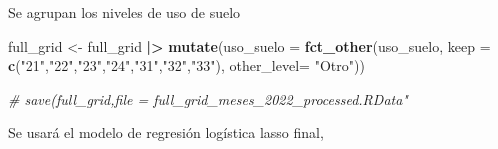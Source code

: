 \documentclass[12pt,a4paper,]{book}
\newenvironment{Shaded}{\begin{snugshade}}{\end{snugshade}}
\newcommand{\AttributeTok}[1]{\textcolor[rgb]{0.13,0.29,0.53}{#1}}
\newcommand{\CommentTok}[1]{\textcolor[rgb]{0.56,0.35,0.01}{\textit{#1}}}
\newcommand{\FunctionTok}[1]{\textcolor[rgb]{0.13,0.29,0.53}{\textbf{#1}}}
\newcommand{\NormalTok}[1]{#1}
\newcommand{\OtherTok}[1]{\textcolor[rgb]{0.56,0.35,0.01}{#1}}
\newcommand{\SpecialCharTok}[1]{\textcolor[rgb]{0.81,0.36,0.00}{\textbf{#1}}}
\newcommand{\StringTok}[1]{\textcolor[rgb]{0.31,0.60,0.02}{#1}}
\numberwithin{dummy}{section}
\theoremstyle{ocrenumbox}
\theoremstyle{blacknumex}
\theoremstyle{blacknumbox}
\theoremstyle{ocrenum}
\theoremstyle{ocrenum}
\begin{document}
\begin{Shaded}
\end{Shaded}

Se agrupan los niveles de uso de suelo

\begin{Shaded}
\begin{Highlighting}[]
\NormalTok{full\_grid }\OtherTok{\textless{}{-}}\NormalTok{ full\_grid }\SpecialCharTok{|\textgreater{}} 
  \FunctionTok{mutate}\NormalTok{(}\AttributeTok{uso\_suelo =} \FunctionTok{fct\_other}\NormalTok{(uso\_suelo,}
                               \AttributeTok{keep =} \FunctionTok{c}\NormalTok{(}\StringTok{"21"}\NormalTok{,}\StringTok{"22"}\NormalTok{,}\StringTok{"23"}\NormalTok{,}\StringTok{"24"}\NormalTok{,}\StringTok{"31"}\NormalTok{,}\StringTok{"32"}\NormalTok{,}\StringTok{"33"}\NormalTok{),}
                               \AttributeTok{other\_level=} \StringTok{"Otro"}\NormalTok{))}

\CommentTok{\# save(full\_grid,file = full\_grid\_meses\_2022\_processed.RData"}
\end{Highlighting}
\end{Shaded}

Se usará el modelo de regresión logística lasso final,
\end{document}
